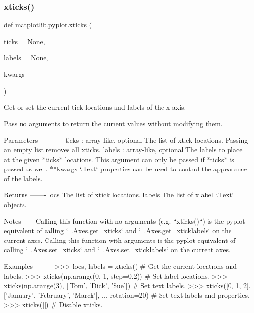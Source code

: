 \mbox{\label{namespacematplotlib_1_1pyplot_a53d2b671a9f59c58afdbe5030f9667e7}} 
\subsubsection{\texorpdfstring{xticks()}{xticks()}}
{\footnotesize\ttfamily def matplotlib.\+pyplot.\+xticks (\begin{DoxyParamCaption}\item[{}]{ticks = {\ttfamily None},  }\item[{}]{labels = {\ttfamily None},  }\item[{}]{kwargs }\end{DoxyParamCaption})}

\begin{DoxyVerb}Get or set the current tick locations and labels of the x-axis.

Pass no arguments to return the current values without modifying them.

Parameters
----------
ticks : array-like, optional
    The list of xtick locations.  Passing an empty list removes all xticks.
labels : array-like, optional
    The labels to place at the given *ticks* locations.  This argument can
    only be passed if *ticks* is passed as well.
**kwargs
    `.Text` properties can be used to control the appearance of the labels.

Returns
-------
locs
    The list of xtick locations.
labels
    The list of xlabel `.Text` objects.

Notes
-----
Calling this function with no arguments (e.g. ``xticks()``) is the pyplot
equivalent of calling `~.Axes.get_xticks` and `~.Axes.get_xticklabels` on
the current axes.
Calling this function with arguments is the pyplot equivalent of calling
`~.Axes.set_xticks` and `~.Axes.set_xticklabels` on the current axes.

Examples
--------
>>> locs, labels = xticks()  # Get the current locations and labels.
>>> xticks(np.arange(0, 1, step=0.2))  # Set label locations.
>>> xticks(np.arange(3), ['Tom', 'Dick', 'Sue'])  # Set text labels.
>>> xticks([0, 1, 2], ['January', 'February', 'March'],
...        rotation=20)  # Set text labels and properties.
>>> xticks([])  # Disable xticks.
\end{DoxyVerb}
 \mbox{\label{namespacematplotlib_1_1pyplot_a5b6bace2f17dcb604db21a4cebd74401}} 

